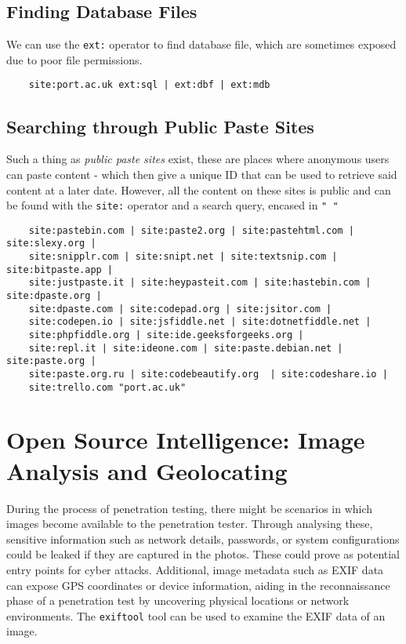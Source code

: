 \subsection{Finding Database Files}
We can use the \verb|ext:| operator to find database file, which are sometimes exposed due to poor file permissions.
\begin{verbatim}
    site:port.ac.uk ext:sql | ext:dbf | ext:mdb
\end{verbatim}

\subsection{Searching through Public Paste Sites}
Such a thing as \textit{public paste sites} exist, these are places where anonymous users can paste content - which then give a unique ID that can be used to retrieve said content at a later date. However, all the content on these sites is public and can be found with the \verb|site:| operator and a search query, encased in \verb|" "|
\begin{verbatim}
    site:pastebin.com | site:paste2.org | site:pastehtml.com | site:slexy.org | 
    site:snipplr.com | site:snipt.net | site:textsnip.com | site:bitpaste.app | 
    site:justpaste.it | site:heypasteit.com | site:hastebin.com | site:dpaste.org | 
    site:dpaste.com | site:codepad.org | site:jsitor.com | 
    site:codepen.io | site:jsfiddle.net | site:dotnetfiddle.net | 
    site:phpfiddle.org | site:ide.geeksforgeeks.org | 
    site:repl.it | site:ideone.com | site:paste.debian.net | site:paste.org | 
    site:paste.org.ru | site:codebeautify.org  | site:codeshare.io | 
    site:trello.com "port.ac.uk"
\end{verbatim}

\section{Open Source Intelligence: Image Analysis and Geolocating}
During the process of penetration testing, there might be scenarios in which images become available to the penetration tester. Through analysing these, sensitive information such as network details, passwords, or system configurations could be leaked if they are captured in the photos. These could prove as potential entry points for cyber attacks. Additional, image metadata such as EXIF data can expose GPS coordinates or device information, aiding in the reconnaissance phase of a penetration test by uncovering physical locations or network environments. The \verb|exiftool| tool can be used to examine the EXIF data of an image. 
